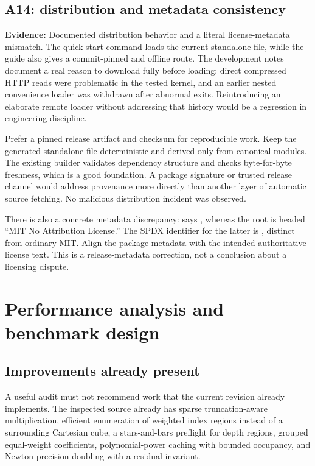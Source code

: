 \documentclass[11pt,a4paper]{article}
\newcommand{\code}[1]{\texttt{\detokenize{#1}}}
\newcommand{\status}[1]{\textbf{Evidence:} #1.}
\theoremstyle{remark}\newtheorem{remark}[proposition]{Remark}
\begin{document}
\subsection{A14: distribution and metadata consistency}
\status{Documented distribution behavior and a literal license-metadata mismatch}
The quick-start command loads the current \code{main} standalone file, while the guide also gives a commit-pinned and offline route. The development notes document a real reason to download fully before loading: direct compressed HTTP reads were problematic in the tested kernel, and an earlier nested convenience loader was withdrawn after abnormal exits. Reintroducing an elaborate remote loader without addressing that history would be a regression in engineering discipline.\cite{guide,development}

Prefer a pinned release artifact and checksum for reproducible work. Keep the generated standalone file deterministic and derived only from canonical modules. The existing builder validates dependency structure and checks byte-for-byte freshness, which is a good foundation. A package signature or trusted release channel would address provenance more directly than another layer of automatic source fetching. No malicious distribution incident was observed.\cite{development,workflow}

There is also a concrete metadata discrepancy: \code{PacletInfo.wl} says \code{"License" -> "MIT"}, whereas the root  is headed ``MIT No Attribution License.'' The SPDX identifier for the latter is \code{MIT-0}, distinct from ordinary MIT. Align the package metadata with the intended authoritative license text. This is a release-metadata correction, not a conclusion about a licensing dispute.\cite{paclet,license,spdx}



\section{Performance analysis and benchmark design}
\subsection{Improvements already present}
A useful audit must not recommend work that the current revision already implements. The inspected source already has sparse truncation-aware multiplication, efficient enumeration of weighted index regions instead of a surrounding Cartesian cube, a stars-and-bars preflight for depth regions, grouped equal-weight coefficients, polynomial-power caching with bounded occupancy, and Newton precision doubling with a residual invariant.\cite{core,incremental}
\end{document}
